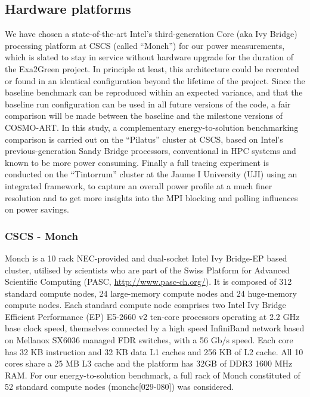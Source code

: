\subsection{Hardware platforms}
\label{subsec:3.1}

We have  chosen a state-of-the-art Intel's  third-generation Core (aka
Ivy  Bridge) processing platform  at CSCS  (called ``Monch'')  for our
power  measurements,  which  is  slated  to stay  in  service  without
hardware  upgrade  for the  duration  of  the  Exa2Green project.   In
principle at least,  this architecture could be recreated  or found in
an identical configuration beyond  the lifetime of the project.  Since
the baseline benchmark can  be reproduced within an expected variance,
and  that the baseline  run configuration  can be  used in  all future
versions  of the  code, a  fair comparison  will be  made  between the
baseline and  the milestone versions  of COSMO-ART.  In this  study, a
complementary  energy-to-solution benchmarking  comparison  is carried
out   on  the   ``Pilatus''  cluster   at  CSCS,   based   on  Intel's
previous-generation  Sandy  Bridge  processors,  conventional  in  HPC
systems and known to be  more power consuming.  Finally a full tracing
experiment is  conducted on the  ``Tintorrum'' cluster at the  Jaume I
University (UJI) using an  integrated framework, to capture an overall
power profile at a much finer resolution and to get more insights into
the MPI blocking and polling influences on power savings.

\subsubsection{CSCS - Monch}
Monch is  a 10 rack  NEC-provided and dual-socket Intel  Ivy Bridge-EP
based  cluster, utilised  by  scientists  who are  part  of the  Swiss
Platform     for      Advanced     Scientific     Computing     (PASC,
\url{http://www.pasc-ch.org/}). It is composed of 312 standard compute
nodes, 24 large-memory compute nodes and 24 huge-memory compute nodes.
Each standard  compute node comprises  two Intel Ivy  Bridge Efficient
Performance (EP)  E5-2660 v2 ten-core processors operating  at 2.2 GHz
base  clock speed,  themselves connected  by a  high  speed InfiniBand
network based on Mellanox SX6036  managed FDR switches, with a 56 Gb/s
speed.  Each core  has 32 KB instruction and 32 KB  data L1 caches and
256  KB of L2  cache. All  10 cores  share a  25 MB  L3 cache  and the
platform has  32GB of  DDR3 1600 MHz  RAM. For  our energy-to-solution
benchmark, a  full rack  of Monch constituted  of 52  standard compute
nodes (monchc[029-080]) was considered.

